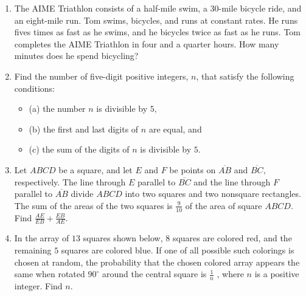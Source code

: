 \documentclass{article}
\begin{document}
\begin{enumerate}[label=\arabic*., itemsep=0.5em]\item The AIME Triathlon consists of a half-mile swim, a 30-mile bicycle ride, and an eight-mile run. Tom swims, bicycles, and runs at constant rates. He runs fives times as fast as he swims, and he bicycles twice as fast as he runs. Tom completes the AIME Triathlon in four and a quarter hours. How many minutes does he spend bicycling?\par \vspace{0.5em}\item Find the number of five-digit positive integers, \(n\), that satisfy the following conditions:

\begin{itemize}
\item (a) the number \(n\) is divisible by \(5,\)
\end{itemize}


\begin{itemize}
\item (b) the first and last digits of \(n\) are equal, and
\end{itemize}


\begin{itemize}
\item (c) the sum of the digits of \(n\) is divisible by \(5.\)
\end{itemize}
\par \vspace{0.5em}\item Let \(ABCD\) be a square, and let \(E\) and \(F\) be points on \(\overline{AB}\) and \(\overline{BC},\) respectively. The line through \(E\) parallel to \(\overline{BC}\) and the line through \(F\) parallel to \(\overline{AB}\) divide \(ABCD\) into two squares and two nonsquare rectangles. The sum of the areas of the two squares is \(\frac{9}{10}\) of the area of square \(ABCD.\) Find \(\frac{AE}{EB} + \frac{EB}{AE}.\)\par \vspace{0.5em}\item In the array of \(13\) squares shown below, \(8\) squares are colored red, and the remaining \(5\) squares are colored blue. If one of all possible such colorings is chosen at random, the probability that the chosen colored array appears the same when rotated \(90^{\circ}\) around the central square is \(\frac{1}{n}\) , where \(n\) is a positive integer. Find \(n\).



\end{enumerate}
\end{document}
